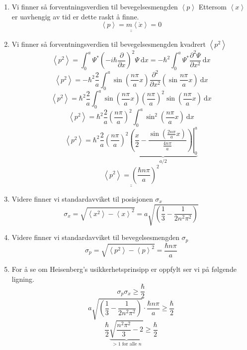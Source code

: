 \documentclass{article}
\begin{document}
\begin{enumerate}[a)]
\begin{enumerate}[\bf I.]
    \item 
    Vi finner så forventningsverdien til bevegelsesmengden $\left<p\right>$ Ettersom $\left<x\right>$ er uavhengig av tid er dette raskt å finne. 
    \[
    \underline{\underline{\left<p\right> = m \left<\dot{x}\right> = 0}}
    \] 
    
    \item 
    Vi finner så forventningsverdien til bevegelsesmengden kvadrert $\left<p^2\right>$
    \[
    \left<p^2\right> = ∫_{0}^{a} Ψ^{*} \left(-iℏ \frac{∂}{∂x}\right)^2 Ψ \ \mathrm{d}x = -ℏ^2∫_{0}^{a} Ψ^{*} \frac{∂^2Ψ}{∂x^2} \ \mathrm{d}x
    \]
    \[
    \left<p^2\right> = -ℏ^2 \frac{2}{a} ∫_{0}^{a} \sin \left(\frac{nπ}{a}x\right) \frac{∂^2}{∂ x^2}\left(\sin \frac{nπ}{a}x\right) \ \mathrm{d}x
    \]
    \[
    \left<p^2\right> = ℏ^2 \frac{2}{a} ∫_{0}^{a} \sin \left(\frac{nπ}{a}x\right) \left(\frac{nπ}{a}\right)^2 \sin \left(\frac{nπ}{a}x\right) \ \mathrm{d}x
    \]
    \[
    \left<p^2\right> = ℏ^2 \frac{2}{a} \left(\frac{nπ}{a}\right)^2 ∫_{0}^{a} \sin^2 \left(\frac{nπ}{a}x\right) \ \mathrm{d}x
    \]
    \[
    \left<p^2\right> =  ℏ^2 \frac{2}{a} \left(\frac{nπ}{a}\right)^2 \underbrace{\left.\left(\frac{x}{2} - \frac{\sin \left(\frac{2nπ}{a}x\right)}{\frac{4nπ}{a}}\right)\right\rvert_{0}^{a}}_{a / 2}
    \]
    \[
    \underline{\underline{\left<p^2\right> = \left(\frac{ℏnπ}{a}\right)^2}}
    \] 
    
    \item 
    Videre finner vi standardavviket til posisjonen $σ_x$
    \[
    σ_x = \sqrt{\left<x^2\right> - \left<x\right>^2} = a\sqrt{\left(\frac{1}{3} - \frac{1}{2n^2π^2}\right)}
    \] 
    \item 
    Videre finner vi standardavviket til bevegelsesmengden $σ_p$
    \[
    σ_p = \sqrt{\left<p^2\right> - \left<p\right>^2} = \frac{ℏnπ}{a}
    \]
    \item 
    For å se om Heisenberg's usikkerhetsprinsipp er oppfylt ser vi på følgende ligning. 
    \[
    σ_pσ_x ≥ \frac{ℏ}{2}
    \]
    \[
        a\sqrt{\left(\frac{1}{3} - \frac{1}{2n^2π^2}\right)} ⋅  \frac{ℏnπ}{a} \ge \frac{ℏ}{2}
    \]
    \[
    \frac{ℏ}{2}\underbrace{\sqrt{\frac{n^2π^2}{3} - 2}}_{>1 \text{ for alle }n} \ge \frac{ℏ}{2}
    \]
    

\end{enumerate}
\end{enumerate}
\end{document}
